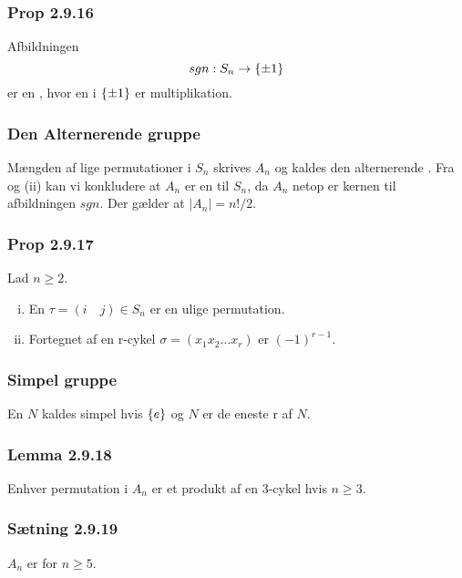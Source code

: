 \subsubsection{Prop 2.9.16}
\label{2.9.16}
Afbildningen
\begin{equation*}
  sgn: S_n \rightarrow \{ \pm 1 \}
\end{equation*}
er en , hvor en i $\{ \pm 1 \}$
er multiplikation.

\subsubsection{Den Alternerende gruppe}
\label{Den Alernerende gruppe}
Mængden af lige permutationer i $S_n$ skrives $A_n$ og kaldes den alternerende
. Fra  og  (ii) kan vi
konkludere at $A_n$ er en  til $S_n$, da $A_n$ netop
er kernen til afbildningen $sgn$. Der gælder at $\mid A_n\mid = n! / 2$.

\subsubsection{Prop 2.9.17}
Lad $n \geq 2$. 
\begin{enumerate}[(i)]
  \item En  $\tau = (i \quad j) \in S_n$ er en ulige
  permutation.
  \item Fortegnet af en r-cykel $\sigma = (x_1 x_2 \ldots x_r)$ er $(-1)^{r-1}$.
\end{enumerate}

\subsubsection{Simpel gruppe}
\label{Simpel gruppe}
En  $N$ kaldes simpel hvis $\{ e \}$ og $N$ er de eneste
r af $N$.

\subsubsection{Lemma 2.9.18}
Enhver permutation i $A_n$ er et produkt af en 3-cykel hvis $n \geq 3$.

\subsubsection{Sætning 2.9.19}
 $A_n$ er  for $n \geq
5$.

